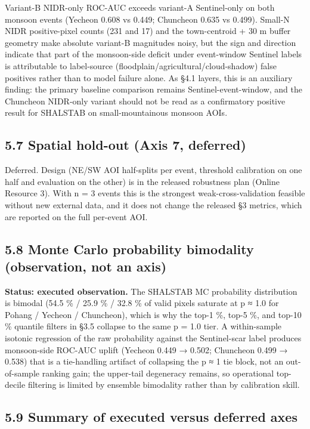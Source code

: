 \documentclass[11pt,a4paper]{article}
\begin{document}
Variant-B NIDR-only ROC-AUC exceeds variant-A Sentinel-only on both monsoon events (Yecheon 0.608 vs 0.449; Chuncheon 0.635 vs 0.499). Small-N NIDR positive-pixel counts (231 and 17) and the town-centroid + 30 m buffer geometry make absolute variant-B magnitudes noisy, but the sign and direction indicate that part of the monsoon-side deficit under event-window Sentinel labels is attributable to label-source (floodplain/agricultural/cloud-shadow) false positives rather than to model failure alone. As §4.1 layers, this is an auxiliary finding: the primary baseline comparison remains Sentinel-event-window, and the Chuncheon NIDR-only variant should not be read as a confirmatory positive result for SHALSTAB on small-mountainous monsoon AOIs.

\subsection{5.7 Spatial hold-out (Axis 7, deferred)}\label{spatial-hold-out-axis-7-deferred}

Deferred. Design (NE/SW AOI half-splits per event, threshold calibration on one half and evaluation on the other) is in the released robustness plan (Online Resource 3). With n = 3 events this is the strongest weak-cross-validation feasible without new external data, and it does not change the released §3 metrics, which are reported on the full per-event AOI.

\subsection{5.8 Monte Carlo probability bimodality (observation, not an axis)}\label{monte-carlo-probability-bimodality-observation-not-an-axis}

\textbf{Status: executed observation.} The SHALSTAB MC probability distribution is bimodal (54.5 \% / 25.9 \% / 32.8 \% of valid pixels saturate at p ≈ 1.0 for Pohang / Yecheon / Chuncheon), which is why the top-1 \%, top-5 \%, and top-10 \% quantile filters in §3.5 collapse to the same p = 1.0 tier. A within-sample isotonic regression of the raw probability against the Sentinel-scar label produces monsoon-side ROC-AUC uplift (Yecheon 0.449 → 0.502; Chuncheon 0.499 → 0.538) that is a tie-handling artifact of collapsing the p ≈ 1 tie block, not an out-of-sample ranking gain; the upper-tail degeneracy remains, so operational top-decile filtering is limited by ensemble bimodality rather than by calibration skill.

\subsection{5.9 Summary of executed versus deferred axes}\label{summary-of-executed-versus-deferred-axes}
\end{document}
